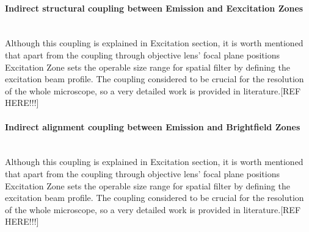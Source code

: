\paragraph{Indirect structural coupling between Emission and Eexcitation Zones}\mbox{}\\
Although this coupling is explained in Excitation section, it is worth mentioned that apart
from the coupling through objective lens' focal plane positions Excitation Zone sets the 
operable size range for spatial filter by defining the excitation beam profile. The coupling
considered to be crucial for the resolution of the whole microscope, so a very detailed work
is provided in literature.[REF HERE!!!]

\paragraph{Indirect alignment coupling between Emission and Brightfield Zones}\mbox{}\\
Although this coupling is explained in Excitation section, it is worth mentioned that apart
from the coupling through objective lens' focal plane positions Excitation Zone sets the 
operable size range for spatial filter by defining the excitation beam profile. The coupling
considered to be crucial for the resolution of the whole microscope, so a very detailed work
is provided in literature.[REF HERE!!!]